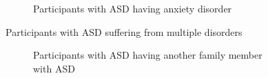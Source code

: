 \documentclass{article}
\begin{document}
\begin{figure}[H]
\begin{subfigure}{0.45\textwidth}
                \caption{Participants with ASD having anxiety disorder}
                \vspace{1em}
                \label{fig:anxiety-bar}
            \end{subfigure}
            \caption{Participants with ASD suffering from multiple disorders}
        \end{figure}
        
        \begin{figure}[H]
            \begin{subfigure}{0.45\textwidth}
                \centering
                \caption{Participants with ASD having another family member with ASD}
                \vspace{1em}
                \label{fig:fam-with-asd}
            \end{subfigure}
            \hfill
            \begin{subfigure}{0.45\textwidth}
                \centering

\end{subfigure}
\end{figure}
\end{document}
